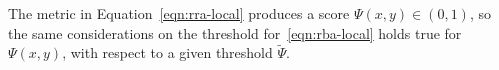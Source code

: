 


The metric in Equation~\ref{eqn:rra-local} produces a score $\Psi (x,y) \in (0,1)$, so the same considerations on the threshold for~\eqref{eqn:rba-local} holds true for $\Psi(x,y)$, with respect to a given threshold $\tilde{\Psi}$.

